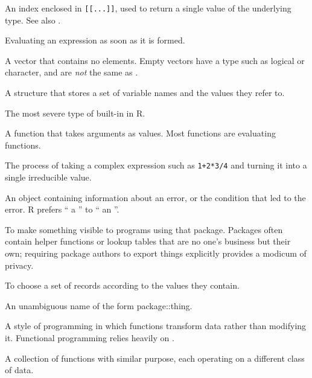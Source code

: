\begin{description}
An index enclosed in \texttt{[[...]]},
used to return a single value of the underlying type.
See also .

Evaluating an expression as soon as it is formed.

A vector that contains no elements.
Empty vectors have a type such as logical or character,
and are \emph{not} the same as .

A structure that stores a set of variable names and the values they refer to.

The most severe type of built-in  in R.

A function that takes arguments as values.
Most functions are evaluating functions.

The process of taking a complex expression such as \texttt{1+2*3/4}
and turning it into a single irreducible value.

An object containing information about an error,
or the condition that led to the error.
R prefers `` a ''
to `` an ''.

To make something visible to programs using that package.
Packages often contain helper functions or lookup tables that are no one's business but their own;
requiring package authors to export things explicitly
provides a modicum of privacy.

To choose a set of records according to the values they contain.

An unambiguous name of the form package::thing.

A style of programming in which functions transform data rather than modifying it.
Functional programming relies heavily on .

A collection of functions with similar purpose,
each operating on a different class of data.


\end{description}
